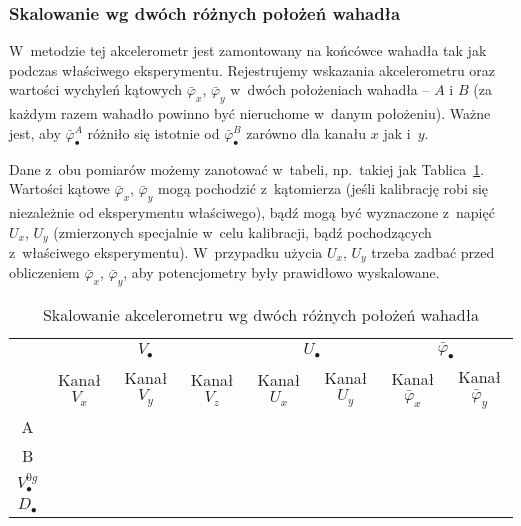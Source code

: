 \documentclass[paper=a4,DIV=12]{tmmlab}
\begin{document}
\subsubsection{Skalowanie wg dwóch różnych położeń wahadła}
\label{sec:BDRBE}

W~metodzie tej akcelerometr jest zamontowany na końcówce wahadła tak jak
podczas właściwego eksperymentu. Rejestrujemy wskazania akcelerometru
oraz wartości wychyleń kątowych $\bar{\varphi}_x$, $\bar{\varphi}_y$ w~dwóch
położeniach wahadła -- $A$ i $B$ (za każdym razem wahadło powinno być
nieruchome w~danym położeniu). Ważne jest, aby $\bar{\varphi}_{\bullet}^A$
różniło się istotnie od $\bar{\varphi}_{\bullet}^B$ zarówno dla kanału $x$ jak
i~$y$.

Dane z~obu pomiarów możemy zanotować w~tabeli, np.~takiej jak
Tablica~\ref{tab:22DGI}. Wartości kątowe $\bar{\varphi}_x$, $\bar{\varphi}_y$
mogą pochodzić z~kątomierza (jeśli kalibrację robi się niezależnie od
eksperymentu właściwego), bądź mogą być wyznaczone z~napięć $U_x$, $U_y$
(zmierzonych specjalnie w~celu kalibracji, bądź pochodzących z~właściwego
eksperymentu). W~przypadku użycia $U_x$, $U_y$ trzeba zadbać przed obliczeniem
$\bar{\varphi}_x$, $\bar{\varphi}_y$, aby potencjometry były prawidłowo
wyskalowane.
\begin{table}[htbp]
  \caption{Skalowanie akcelerometru wg dwóch różnych położeń wahadła}
  \label{tab:22DGI}
  \begin{tabular}{c|c|c|c|c|c|c|c|}
    \cline{2-8}
    & \multicolumn{3}{|c|}{$V_{\bullet}$}
    & \multicolumn{2}{|c|}{$U_{\bullet}$}
    & \multicolumn{2}{|c|}{$\bar{\varphi}_{\bullet}$}
    \\
    \cline{2-8}
    & Kanał $V_{x}$ & Kanał $V_{y}$ & Kanał $V_{z}$
    & Kanał $U_{x}$ & Kanał $U_{y}$
    & Kanał $\bar{\varphi}_{x}$ & Kanał $\bar{\varphi}_{y}$
    \\
    \hline
    \multicolumn{1}{|c|}{A} & & & & & & & \\ \hline
    \multicolumn{1}{|c|}{B} & & & & & & & \\ \hline
    \multicolumn{1}{|c|}{$V_{\bullet}^{0g}$}  & & & & \multicolumn{4}{|c}{} \\ \cline{1-4}
    \multicolumn{1}{|c|}{$D_{\bullet}$}  & & & & \multicolumn{4}{|c}{} \\ \cline{1-4}
  \end{tabular}
\end{table}
\end{document}
